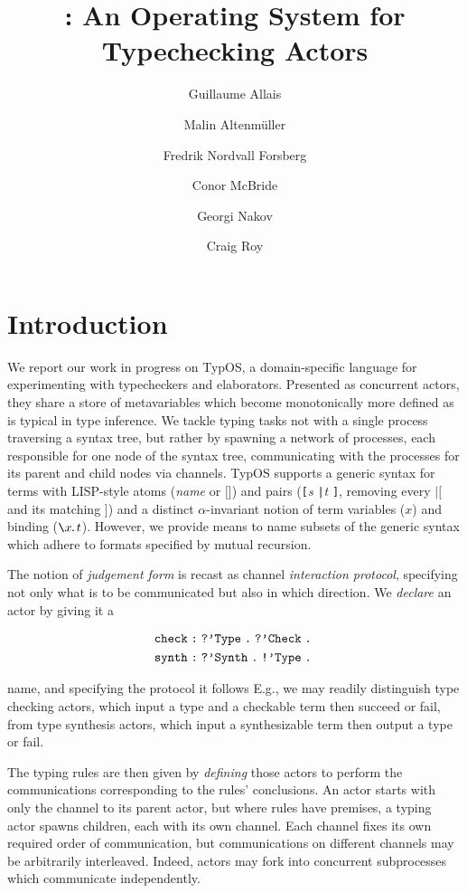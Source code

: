 \documentclass{easychair}
\author{
  Guillaume Allais\inst{1}
  \and
  Malin Altenm\"uller\inst{2}
  \and
  Fredrik Nordvall Forsberg\inst{2}
  \and
  Conor McBride\inst{2}
  \and
  Georgi Nakov\inst{2}
  \and
  Craig Roy\inst{3}
}
\institute{
University of St Andrews,
United Kingdom \\
\and
University of Strathclyde,
Glasgow, United Kingdom\\
\and
Quantinuum \& Cambridge Quantum, United Kingdom
}
\title{\TypOS: An Operating System for Typechecking Actors}
\newcommand{\TypOS}{TypOS\xspace}
\newcommand{\nil}{\texttt{[]}}
\newcommand{\lsq}{\texttt{[}}
\newcommand{\pipe}{\texttt{|}}
\newcommand{\rsq}{\texttt{]}}
\newcommand{\atom}[1]{\texttt{\symbol{39}}#1\;}
\newcommand{\bsl}{\texttt{\symbol{92}}}
\newcommand{\bind}[1]{\bsl #1\!\texttt{.}}
\newcommand{\listof}[1]{\lsq #1 \rsq}
\newcommand{\hab}{\;\texttt{:}\;}
\newcommand{\bang}{\texttt{!}}
\newcommand{\query}{\texttt{?}}
\newcommand{\pair}[2]{\listof{#1 \pipe #2}}
\newcommand{\then}{\texttt{.}\;}
\begin{document}
\maketitle


\section*{Introduction} %

We report our work in progress on \TypOS{}, a domain-specific language
for experimenting with typecheckers and elaborators. Presented as
concurrent actors, they share a store of metavariables which become
monotonically more defined as is typical in type inference.  We
tackle typing tasks not with a single process traversing a syntax
tree, but rather by spawning a network of processes, each responsible
for one node of the syntax tree, communicating with the processes for
its parent and child nodes via channels.  \TypOS{} supports a generic
syntax for terms with LISP-style atoms (\atom{\textit{name}} or
$\nil$) and pairs (\pair{\textit{s}}{\textit{t}}, removing every
$\pipe\lsq$ and its matching $\rsq$) and a distinct $\alpha$-invariant
notion of term variables ($x$) and binding ($\bind x t$). However, we
provide means to name subsets of the generic syntax which adhere to
formats specified by mutual recursion.

The notion of \emph{judgement form} is recast as channel
\emph{interaction protocol}, specifying not only what is to be
communicated but also in which direction.
We \emph{declare} an actor by
giving it a
\begin{wrapfigure}{r}{0.3\textwidth}
 \vspace{-.5\baselineskip}
  \begin{align*}
    \tt check \hab \query\atom{Type}\then \query\atom{Check}\then \\
    \tt synth \hab \query\atom{Synth}\then \bang\atom{Type}\then
  \end{align*}
\end{wrapfigure}
name, and specifying the protocol it follows E.g., we may
readily distinguish type checking actors, which input a type and a
checkable term then succeed or fail,
from type synthesis actors, which input a synthesizable term then
output a type or fail.


The typing rules are then given by \emph{defining} those actors to
perform the communications corresponding to the rules' conclusions. An
actor starts with only the channel to its parent actor, but where
rules have premises, a typing actor spawns children, each with its own
channel.  Each channel fixes its own required order of communication, but
communications on different channels may be arbitrarily interleaved.
Indeed, actors may fork into concurrent subprocesses which communicate
independently.
\end{document}
